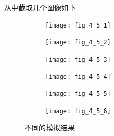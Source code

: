 \documentclass[UTF8]{ctexart}
\begin{document}
    从中截取几个图像如下
    \begin{figure}[htbp]
        \centering
        \begin{subfigure}[b]{0.42\textwidth}
            \texttt{[image: fig\_4\_5\_1]}
            \label{fig:4.5.1}
        \end{subfigure}
        \hfill
        \begin{subfigure}[b]{0.42\textwidth}
            \texttt{[image: fig\_4\_5\_2]}
            \label{fig:4.5.2}
        \end{subfigure}
        \centering
        \begin{subfigure}[b]{0.42\textwidth}
            \texttt{[image: fig\_4\_5\_3]}
            \label{fig:4.5.3}
        \end{subfigure}
        \hfill
        \begin{subfigure}[b]{0.42\textwidth}
            \texttt{[image: fig\_4\_5\_4]}
            \label{fig:4.5.4}
        \end{subfigure}
        \hfill
        \begin{subfigure}[b]{0.42\textwidth}
            \texttt{[image: fig\_4\_5\_5]}
            \label{fig:4.5.5}
        \end{subfigure}
        \centering
        \begin{subfigure}[b]{0.42\textwidth}
            \texttt{[image: fig\_4\_5\_6]}
            \label{fig:4.5.6}
        \end{subfigure}
        \caption{不同的模拟结果}\label{fig:4.5}
    \end{figure}

    \newpage
\end{document}
